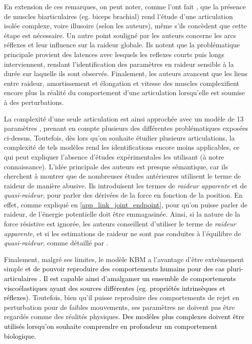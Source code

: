 En extension de ces remarques, on peut noter, comme l'ont fait \textcite{latash_joint_1993}, que la présence de muscles biarticulaires (eg. biceps brachial) rend l'étude d'une articulation isolée complexe, voire illusoire (selon les auteurs), même s'ils concèdent que cette étape est nécessaire. Un autre point souligné par les auteurs concerne les arcs réflexes et leur influence sur la raideur globale. Ils notent que la problématique principale provient des latences avec lesquels les reflexes courts puis longs interviennent, rendant l'identification des paramètres en raideur sensible à la durée sur laquelle ils sont observés. Finalement, les auteurs avancent que les liens entre raideur, amortissement et élongation et vitesse des muscles complexifient encore plus la réalité du comportement d'une articulation lorsqu'elle est soumise à des perturbations.

La complexité d'une seule articulation est ainsi approchée avec un modèle de 13 paramètres \parencite[équation~14]{latash_joint_1993}, prenant en compte plusieurs des différentes problématiques exposées ci-dessus. Toutefois, dès lors qu'on souhaite étudier plusieurs articulations, la complexité de tels modèles rend les identifications encore moins applicables, ce qui peut expliquer l'absence d'études expérimentales les utilisant (à notre connaissance). L'idée principale des auteurs est presque sémantique, car ils cherchent à montrer que de nombreuses études antérieures utilisent le terme de raideur de manière abusive. Ils introduisent les termes de \emph{raideur apparente} et de \emph{quasi-raideur}, pour parler des dérivées de la force en fonction de la position. En effet, comme expliqué en \cref{app_link_joint_endpoint}, pour qu'on puisse parler de raideur, de l'énergie potentielle doit être emmagasinée. Ainsi, si la nature de la force résistive est ignorée, les auteurs conseillent d'utiliser le terme de \emph{raideur apparente}, et si les estimations de raideur ne sont pas conduites à l'équilibre de \emph{quasi-raideur}, comme détaillé par \textcite{rouse_difference_2013}.


Finalement, malgré ses limites, le modèle KBM a l'avantage d'être extrêmement simple \textcolor{black}{et de pouvoir reproduire des comportements humains pour des cas pluri-articulaires \parencite{tee_model_2004}. Il est capable ainsi d'amalgamer un ensemble de comportements viscoélastiques ayant des sources différentes (eg. propriétés intrinsèques et réflexes).} Toutefois, bien qu'il puisse reproduire des comportements de rejet en perturbation pour de faibles mouvements, ses paramètres ne doivent pas être regardés comme des réalités physiques. \textcolor{black}{Des modèles plus complexes doivent être utilisés lorsqu'on souhaite comprendre en profondeur un comportement biologique.}

